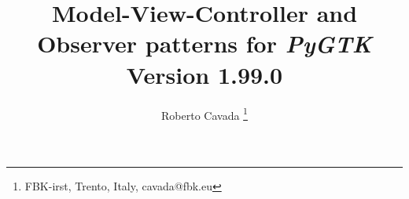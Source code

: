 \documentclass{article}
\newcommand{\appl}[1]{\textsl{#1}\xspace}
\newcommand{\pygtk}{\appl{PyGTK}}
\begin{document}
\title{Model-View-Controller and Observer patterns for \pygtk \\
Version 1.99.0}

\author{ Roberto Cavada \thanks{FBK-irst, Trento, Italy,
 cavada@fbk.eu} }

\maketitle

\tableofcontents

\newpage



\newpage


\newpage


\newpage


\newpage


\newpage


\newpage


\newpage

\end{document}
